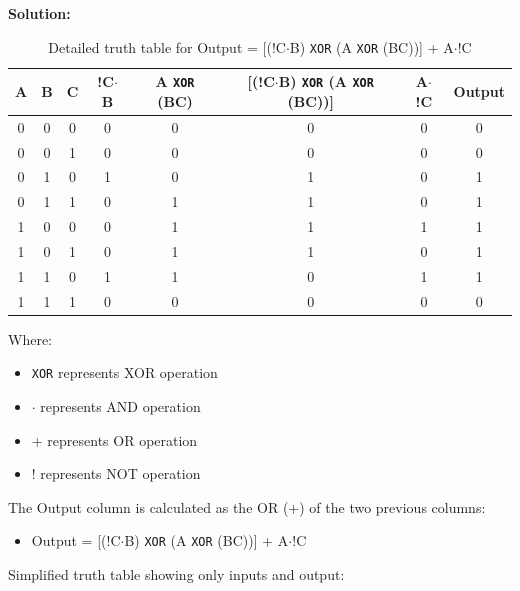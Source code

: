 \textbf{Solution:}

\begin{table}[H]
    \centering
    \begin{tabular}{|c|c|c|c|c|c|c|c|}
        \hline
        A & B & C & !C$\cdot$B & A \texttt{XOR} (BC) & [(!C$\cdot$B) \texttt{XOR} (A \texttt{XOR} (BC))] & A$\cdot$!C & Output \\
        \hline
        0 & 0 & 0 & 0 & 0 & 0 & 0 & 0 \\
        0 & 0 & 1 & 0 & 0 & 0 & 0 & 0 \\
        0 & 1 & 0 & 1 & 0 & 1 & 0 & 1 \\
        0 & 1 & 1 & 0 & 1 & 1 & 0 & 1 \\
        1 & 0 & 0 & 0 & 1 & 1 & 1 & 1 \\
        1 & 0 & 1 & 0 & 1 & 1 & 0 & 1 \\
        1 & 1 & 0 & 1 & 1 & 0 & 1 & 1 \\
        1 & 1 & 1 & 0 & 0 & 0 & 0 & 0 \\
        \hline
    \end{tabular}
    \caption{Detailed truth table for Output = [(!C$\cdot$B) \texttt{XOR} (A \texttt{XOR} (BC))] + A$\cdot$!C}
    \label{tab:detailed_truth_table}
\end{table}

\noindent
Where:
\begin{itemize}
    \item \texttt{XOR} represents XOR operation
    \item $\cdot$ represents AND operation
    \item + represents OR operation
    \item ! represents NOT operation
\end{itemize}
\noindent
The Output column is calculated as the OR (+) of the two previous columns:
\begin{itemize}
    \item Output = [(!C$\cdot$B) \texttt{XOR} (A \texttt{XOR} (BC))] + A$\cdot$!C
\end{itemize}

\vspace{1cm}

\noindent
Simplified truth table showing only inputs and output:

